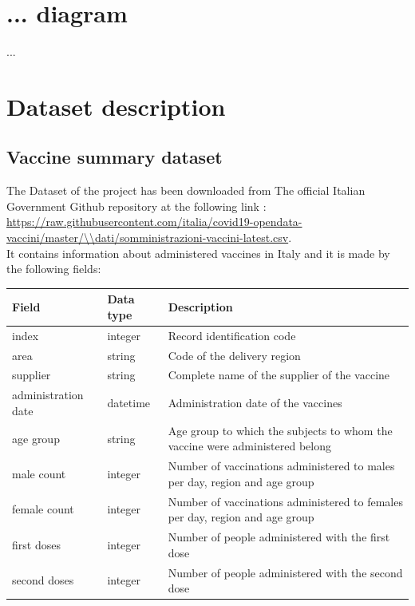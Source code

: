 \documentclass{article}
\begin{document}
\hfill\break
\newpage

\section{... diagram}
...

\newpage
\section{Dataset description}
\subsection{Vaccine summary dataset}
The Dataset of the project has been downloaded from The official Italian Government Github repository at the following link :\\ \url{https://raw.githubusercontent.com/italia/covid19-opendata-vaccini/master/\\dati/somministrazioni-vaccini-latest.csv}.
\\
\hfill\break
It contains information about administered vaccines in Italy and it is made by the following fields:
\hfill\break
\begin{center}
\begin{tabular}{ |m{4cm}|m{2cm}|m{4.5cm}|}
  \hline
  \bfseries{Field} & \bfseries{Data type} & \bfseries{Description} \\
  \hline\hline
  index & integer & Record identification code\\
  \hline
  area & string & Code of the delivery region\\
    \hline
      supplier & string & Complete name of the supplier of the vaccine\\
    \hline
          administration date & datetime & Administration date of the vaccines\\
              \hline
          age group & string & Age group to which the subjects to whom the vaccine were administered belong\\
                        \hline
          male count & integer & Number of vaccinations administered to males per day, region and age group\\
                        \hline
          female count & integer & Number of vaccinations administered to females per day, region and age group\\
    \hline
  first doses & integer & Number of people administered with the first dose\\ 
    \hline
  second doses & integer & Number of people administered with the second dose\\
    \hline

\end{tabular}
\end{center}
\end{document}
